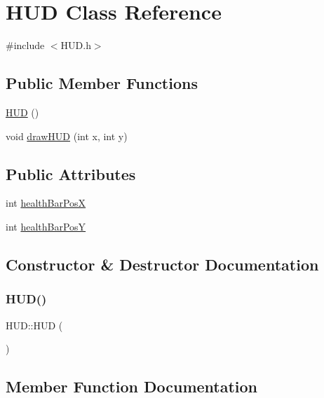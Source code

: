 \hypertarget{class_h_u_d}{}\section{H\+UD Class Reference}
\label{class_h_u_d}


{\ttfamily \#include $<$H\+U\+D.\+h$>$}

\subsection*{Public Member Functions}
\begin{DoxyCompactItemize}
\item 
\hyperlink{class_h_u_d_a568b8ee1591f9ba3ed36ae05966f6b56}{H\+UD} ()
\item 
void \hyperlink{class_h_u_d_a5f3f7d3fde8133a38501c9db935da955}{draw\+H\+UD} (int x, int y)
\end{DoxyCompactItemize}
\subsection*{Public Attributes}
\begin{DoxyCompactItemize}
\item 
int \hyperlink{class_h_u_d_a1061ae317ebe12a5a3cef7500670fae1}{health\+Bar\+PosX}
\item 
int \hyperlink{class_h_u_d_a8bc4987d1daffd2286a483fb77c033ee}{health\+Bar\+PosY}
\end{DoxyCompactItemize}


\subsection{Constructor \& Destructor Documentation}
\mbox{\label{class_h_u_d_a568b8ee1591f9ba3ed36ae05966f6b56}} 
\subsubsection{\texorpdfstring{H\+U\+D()}{HUD()}}
{\footnotesize\ttfamily H\+U\+D\+::\+H\+UD (\begin{DoxyParamCaption}{ }\end{DoxyParamCaption})}



\subsection{Member Function Documentation}
\mbox{\label{class_h_u_d_a5f3f7d3fde8133a38501c9db935da955}} 

